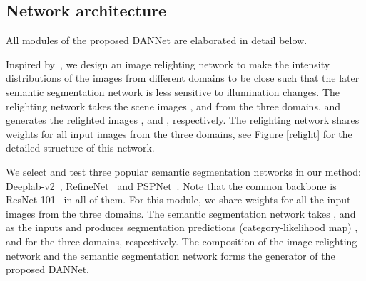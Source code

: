 \documentclass[final]{cvpr}
\begin{document}
\subsection{Network architecture}
\begin{figure*}[htbp]
	\vspace{-4pt}
\end{figure*}
All modules of the proposed DANNet are elaborated in detail below.

\vspace{0.1cm}
Inspired by~\cite{jenicek2019no}, we design an image  relighting  network to make the intensity distributions of the images from different domains to be close such that the later semantic segmentation network is less sensitive to illumination changes. 
The relighting network takes the scene images ,  and   from the three domains, and generates the relighted images ,  and , respectively.
The relighting network shares weights for all input images from the three domains, see Figure \ref{relight} for the detailed  structure of this network. 

\vspace{0.1cm}
\hspace{0.2cm}
We select and test three popular semantic segmentation networks in our method: Deeplab-v2~\cite{chen2017deeplab}, RefineNet~\cite{Lin:2017:RefineNet} and PSPNet~\cite{zhao2017pyramid}. Note that the
common backbone is ResNet-101~\cite{he2016deep}  in all of them.
For this module, we share weights for all the input images from the three domains. 
The semantic segmentation network takes ,  and  as the inputs and produces segmentation predictions (category-likelihood map) ,  and  for the three domains, respectively. The composition of
the image relighting network and the semantic segmentation network forms the {generator}  of the proposed DANNet.
\end{document}
